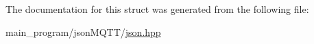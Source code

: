 The documentation for this struct was generated from the following file\+:\begin{DoxyCompactItemize}
\item 
main\+\_\+program/json\+M\+Q\+T\+T/\hyperlink{json_8hpp}{json.\+hpp}\end{DoxyCompactItemize}
